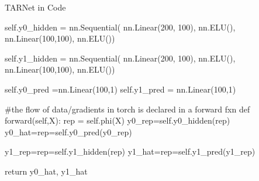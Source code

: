 \begin{TCBBox}[label=box:tarnetcode]{TARNet in Code}
\begin{python}
        self.y0_hidden = nn.Sequential(
            nn.Linear(200, 100),
            nn.ELU(),
            nn.Linear(100,100),
            nn.ELU())
            
        self.y1_hidden = nn.Sequential(
            nn.Linear(200, 100),
            nn.ELU(),
            nn.Linear(100,100),
            nn.ELU())
            
        self.y0_pred =nn.Linear(100,1)
        self.y1_pred = nn.Linear(100,1)
        
    #the flow of data/gradients in torch is declared in a forward fxn    
    def forward(self,X):
        rep = self.phi(X)
        y0_rep=self.y0_hidden(rep)
        y0_hat=rep=self.y0_pred(y0_rep)
        
        y1_rep=rep=self.y1_hidden(rep)
        y1_hat=rep=self.y1_pred(y1_rep)
        
        return y0_hat, y1_hat
\end{python}
\end{TCBBox}